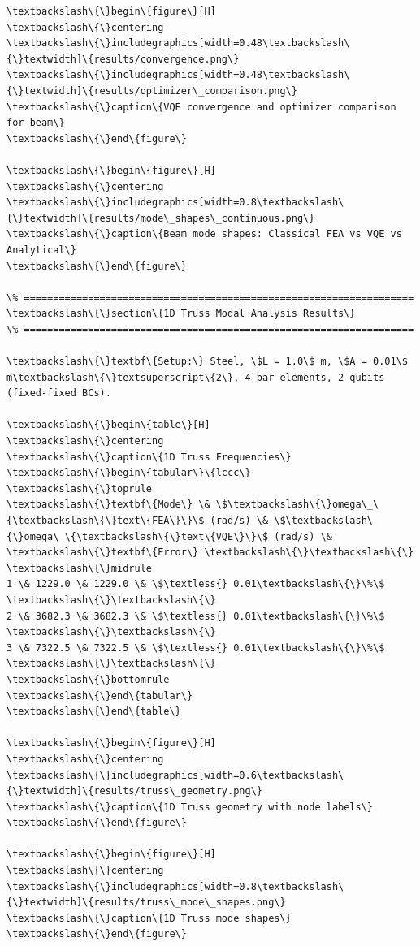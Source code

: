\documentclass[12pt, a4paper]{article}
\begin{document}
\begin{lstlisting}[style=codestyle, caption={VQA\_Modal\_Analysis\_Report.tex}]
\textbackslash\{\}begin\{figure\}[H]
\textbackslash\{\}centering
\textbackslash\{\}includegraphics[width=0.48\textbackslash\{\}textwidth]\{results/convergence.png\}
\textbackslash\{\}includegraphics[width=0.48\textbackslash\{\}textwidth]\{results/optimizer\_comparison.png\}
\textbackslash\{\}caption\{VQE convergence and optimizer comparison for beam\}
\textbackslash\{\}end\{figure\}

\textbackslash\{\}begin\{figure\}[H]
\textbackslash\{\}centering
\textbackslash\{\}includegraphics[width=0.8\textbackslash\{\}textwidth]\{results/mode\_shapes\_continuous.png\}
\textbackslash\{\}caption\{Beam mode shapes: Classical FEA vs VQE vs Analytical\}
\textbackslash\{\}end\{figure\}

\% ===================================================================
\textbackslash\{\}section\{1D Truss Modal Analysis Results\}
\% ===================================================================

\textbackslash\{\}textbf\{Setup:\} Steel, \$L = 1.0\$ m, \$A = 0.01\$ m\textbackslash\{\}textsuperscript\{2\}, 4 bar elements, 2 qubits (fixed-fixed BCs).

\textbackslash\{\}begin\{table\}[H]
\textbackslash\{\}centering
\textbackslash\{\}caption\{1D Truss Frequencies\}
\textbackslash\{\}begin\{tabular\}\{lccc\}
\textbackslash\{\}toprule
\textbackslash\{\}textbf\{Mode\} \& \$\textbackslash\{\}omega\_\{\textbackslash\{\}text\{FEA\}\}\$ (rad/s) \& \$\textbackslash\{\}omega\_\{\textbackslash\{\}text\{VQE\}\}\$ (rad/s) \& \textbackslash\{\}textbf\{Error\} \textbackslash\{\}\textbackslash\{\}
\textbackslash\{\}midrule
1 \& 1229.0 \& 1229.0 \& \$\textless{} 0.01\textbackslash\{\}\%\$ \textbackslash\{\}\textbackslash\{\}
2 \& 3682.3 \& 3682.3 \& \$\textless{} 0.01\textbackslash\{\}\%\$ \textbackslash\{\}\textbackslash\{\}
3 \& 7322.5 \& 7322.5 \& \$\textless{} 0.01\textbackslash\{\}\%\$ \textbackslash\{\}\textbackslash\{\}
\textbackslash\{\}bottomrule
\textbackslash\{\}end\{tabular\}
\textbackslash\{\}end\{table\}

\textbackslash\{\}begin\{figure\}[H]
\textbackslash\{\}centering
\textbackslash\{\}includegraphics[width=0.6\textbackslash\{\}textwidth]\{results/truss\_geometry.png\}
\textbackslash\{\}caption\{1D Truss geometry with node labels\}
\textbackslash\{\}end\{figure\}

\textbackslash\{\}begin\{figure\}[H]
\textbackslash\{\}centering
\textbackslash\{\}includegraphics[width=0.8\textbackslash\{\}textwidth]\{results/truss\_mode\_shapes.png\}
\textbackslash\{\}caption\{1D Truss mode shapes\}
\textbackslash\{\}end\{figure\}


\end{lstlisting}
\end{document}
